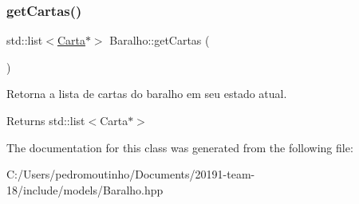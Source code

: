 \subsubsection{\texorpdfstring{getCartas()}{getCartas()}}
{\footnotesize\ttfamily std\+::list$<$\mbox{\hyperlink{class_carta}{Carta}}$\ast$$>$ Baralho\+::get\+Cartas (\begin{DoxyParamCaption}{ }\end{DoxyParamCaption})}



Retorna a lista de cartas do baralho em seu estado atual. 

\begin{DoxyReturn}{Returns}
std\+::list$<$\+Carta$\ast$$>$ 
\end{DoxyReturn}


The documentation for this class was generated from the following file\+:\begin{DoxyCompactItemize}
\item 
C\+:/\+Users/pedromoutinho/\+Documents/20191-\/team-\/18/include/models/Baralho.\+hpp\end{DoxyCompactItemize}
